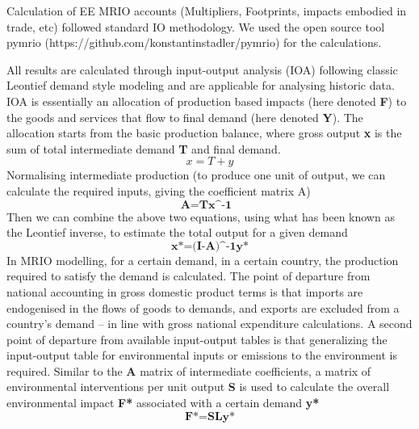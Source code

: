 Calculation of EE MRIO accounts (Multipliers, Footprints, impacts embodied in trade, etc) followed
standard IO methodology. We used the open source tool pymrio (https://github.com/konstantinstadler/pymrio) for the calculations.

All results are  calculated through input-output analysis (IOA) following classic Leontief demand style modeling and are applicable for analysing historic data. IOA is essentially an allocation of production based impacts (here denoted \textbf{F}) to the goods and services that flow to final demand (here denoted \textbf{Y}). The allocation starts from the basic production balance, where gross output \textbf{x} is the sum of total intermediate demand \textbf{T} and final demand. \begin{equation}x=T+y
\end{equation}
Normalising intermediate production (to produce one unit of output, we can calculate the required inputs, giving the coefficient matrix A)
\begin{equation}
\textbf{A=T{x^-1} }
\end{equation}
Then we can combine the above two equations, using what has been known as the Leontief inverse, to estimate the total output for a given demand
\begin{equation}
\textbf{x*={(I-A)^-1}y*}
\end{equation}
In MRIO modelling, for a certain demand, in a certain country, the production required to satisfy the demand is calculated. The point of departure from national accounting in gross domestic product terms is that imports are endogenised in the flows of goods to demands, and exports are excluded from a country’s demand – in line with gross national expenditure calculations. A second point of departure from available input-output tables is that generalizing the input-output table for environmental inputs or emissions to the environment is required. Similar to the \textbf{A} matrix of intermediate coefficients, a matrix of environmental interventions per unit output \textbf{S} is used to calculate the overall environmental impact \textbf{F*} associated with a certain demand \textbf{y*} 
\begin{equation}
\textbf{F*=SLy*}
\end{equation}